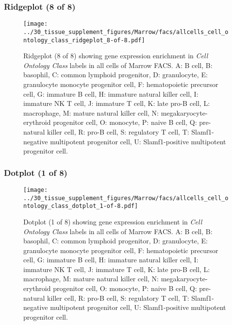 \subsubsection{Ridgeplot (8 of 8)}
\begin{figure}[h]
\centering
\texttt{[image: ../30\_tissue\_supplement\_figures/Marrow/facs/allcells\_cell\_ontology\_class\_ridgeplot\_8-of-8.pdf]}

\caption{ Ridgeplot (8 of 8)  showing gene expression enrichment in \emph{Cell Ontology Class} labels in all cells of Marrow FACS. A: B cell, B: basophil, C: common lymphoid progenitor, D: granulocyte, E: granulocyte monocyte progenitor cell, F: hematopoietic precursor cell, G: immature B cell, H: immature natural killer cell, I: immature NK T cell, J: immature T cell, K: late pro-B cell, L: macrophage, M: mature natural killer cell, N: megakaryocyte-erythroid progenitor cell, O: monocyte, P: naive B cell, Q: pre-natural killer cell, R: pro-B cell, S: regulatory T cell, T: Slamf1-negative multipotent progenitor cell, U: Slamf1-positive multipotent progenitor cell.}
\end{figure}


\clearpage

\subsubsection{Dotplot (1 of 8)}
\begin{figure}[h]
\centering
\texttt{[image: ../30\_tissue\_supplement\_figures/Marrow/facs/allcells\_cell\_ontology\_class\_dotplot\_1-of-8.pdf]}

\caption{ Dotplot (1 of 8)  showing gene expression enrichment in \emph{Cell Ontology Class} labels in all cells of Marrow FACS. A: B cell, B: basophil, C: common lymphoid progenitor, D: granulocyte, E: granulocyte monocyte progenitor cell, F: hematopoietic precursor cell, G: immature B cell, H: immature natural killer cell, I: immature NK T cell, J: immature T cell, K: late pro-B cell, L: macrophage, M: mature natural killer cell, N: megakaryocyte-erythroid progenitor cell, O: monocyte, P: naive B cell, Q: pre-natural killer cell, R: pro-B cell, S: regulatory T cell, T: Slamf1-negative multipotent progenitor cell, U: Slamf1-positive multipotent progenitor cell.}
\end{figure}


\clearpage

